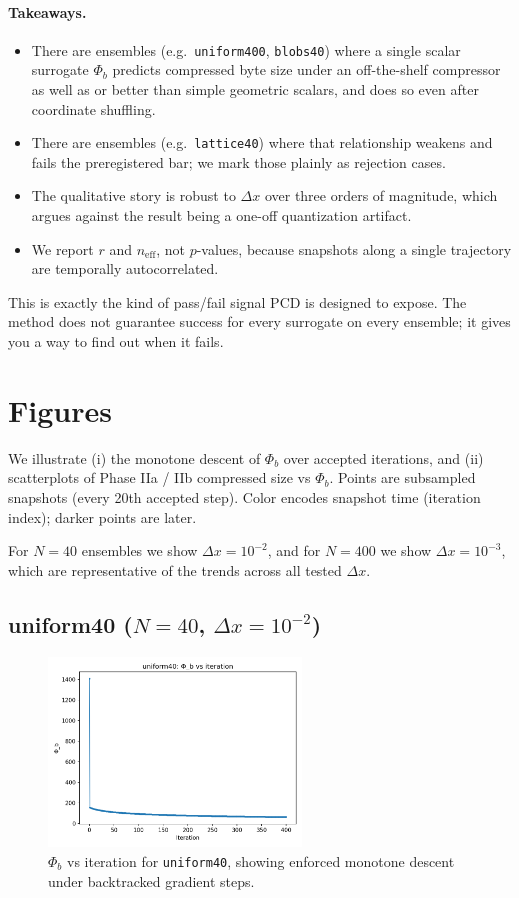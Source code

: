 \documentclass[11pt,a4paper]{article}
\numberwithin{equation}{section}
\newcommand{\phib}{\Phi_b}
\begin{document}
\paragraph{Takeaways.}
\begin{itemize}
\item There are ensembles (e.g.\ \texttt{uniform400}, \texttt{blobs40}) where a single scalar surrogate $\phib$ predicts compressed byte size under an off-the-shelf compressor as well as or better than simple geometric scalars, and does so even after coordinate shuffling.
\item There are ensembles (e.g.\ \texttt{lattice40}) where that relationship weakens and fails the preregistered bar; we mark those plainly as rejection cases.
\item The qualitative story is robust to $\Delta x$ over three orders of magnitude, which argues against the result being a one-off quantization artifact.
\item We report $r$ and $n_{\text{eff}}$, not $p$-values, because snapshots along a single trajectory are temporally autocorrelated.
\end{itemize}

This is exactly the kind of pass/fail signal PCD is designed to expose. The method does not guarantee success for every surrogate on every ensemble; it gives you a way to find out when it fails.

\section{Figures}
We illustrate (i) the monotone descent of $\phib$ over accepted iterations, and (ii) scatterplots of Phase IIa / IIb compressed size vs $\phib$. Points are subsampled snapshots (every 20th accepted step). Color encodes snapshot time (iteration index); darker points are later.

For $N{=}40$ ensembles we show $\Delta x = 10^{-2}$, and for $N{=}400$ we show $\Delta x = 10^{-3}$, which are representative of the trends across all tested $\Delta x$.

\subsection{uniform40 ($N{=}40$, $\Delta x = 10^{-2}$)}
\begin{figure}[h!]
\centering
\includegraphics[width=0.6\textwidth]{figures/uniform40_dx0.01_phib_vs_iter.png}
\caption{$\phib$ vs iteration for \texttt{uniform40}, showing enforced monotone descent under backtracked gradient steps.}
\label{fig:uniform40_iter}
\end{figure}
\end{document}
